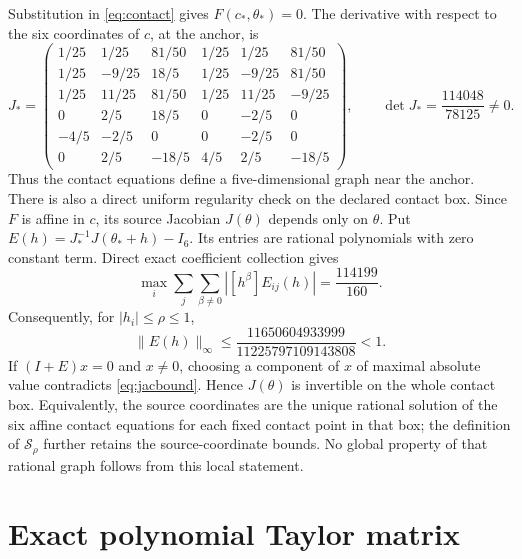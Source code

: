 \documentclass[11pt]{article}
\newcommand{\norm}[1]{\lVert #1\rVert}
\theoremstyle{definition}
\begin{document}
Substitution in \eqref{eq:contact} gives $F(c_*,\theta_*)=0$. The derivative
with respect to the six coordinates of $c$, at the anchor, is
\begin{equation}
 J_*=
 \begin{pmatrix}
 1/25&1/25&81/50&1/25&1/25&81/50\\
 1/25&-9/25&18/5&1/25&-9/25&81/50\\
 1/25&11/25&81/50&1/25&11/25&-9/25\\
 0&2/5&18/5&0&-2/5&0\\
 -4/5&-2/5&0&0&-2/5&0\\
 0&2/5&-18/5&4/5&2/5&-18/5
 \end{pmatrix},\qquad
 \det J_*=\frac{114048}{78125}\ne0.
 \label{eq:jacobian}
\end{equation}
Thus the contact equations define a five-dimensional graph near the anchor.
There is also a direct uniform regularity check on the declared contact box.
Since $F$ is affine in $c$, its source Jacobian $J(\theta)$ depends only on
$\theta$. Put $E(h)=J_*^{-1}J(\theta_*+h)-I_6$. Its entries are rational
polynomials with zero constant term. Direct exact coefficient collection gives
\begin{equation}
 \max_i\sum_j\sum_{\beta\ne0}|[h^\beta]E_{ij}(h)|
   =\frac{114199}{160}.
 \label{eq:jacnorm}
\end{equation}
Consequently, for $|h_i|\leq\rho\leq1$,
\begin{equation}
 \norm{E(h)}_\infty\leq
 \frac{11650604933999}{11225797109143808}<1.
 \label{eq:jacbound}
\end{equation}
If $(I+E)x=0$ and $x\ne0$, choosing a component of $x$ of maximal absolute
value contradicts \eqref{eq:jacbound}. Hence $J(\theta)$ is invertible on the
whole contact box. Equivalently, the source coordinates are the unique
rational solution of the six affine contact equations for each fixed contact
point in that box; the definition of $\mathcal S_\rho$ further retains the
source-coordinate bounds. No global property of that rational graph follows
from this local statement.

\section{Exact polynomial Taylor matrix}
\end{document}
